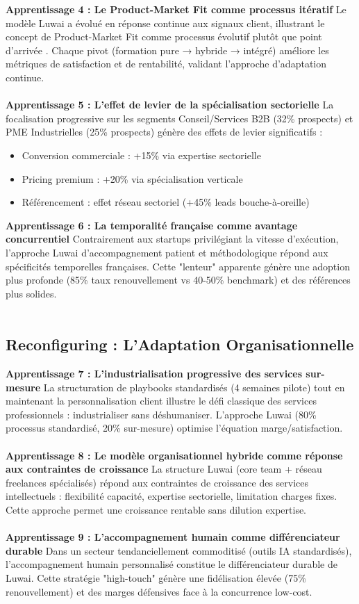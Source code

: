 \textbf{Apprentissage 4 : Le Product-Market Fit comme processus itératif}
Le modèle Luwai a évolué en réponse continue aux signaux client, illustrant le concept de Product-Market Fit comme processus évolutif plutôt que point d'arrivée \cite{blank2013startup}. Chaque pivot (formation pure → hybride → intégré) améliore les métriques de satisfaction et de rentabilité, validant l'approche d'adaptation continue.
\\\\
\textbf{Apprentissage 5 : L'effet de levier de la spécialisation sectorielle}
La focalisation progressive sur les segments Conseil/Services B2B (32\% prospects) et PME Industrielles (25\% prospects) génère des effets de levier significatifs :
\begin{itemize}
    \item Conversion commerciale : +15\% via expertise sectorielle
    \item Pricing premium : +20\% via spécialisation verticale
    \item Référencement : effet réseau sectoriel (+45\% leads bouche-à-oreille)
\end{itemize}
\medskip
\textbf{Apprentissage 6 : La temporalité française comme avantage concurrentiel}
Contrairement aux startups privilégiant la vitesse d'exécution, l'approche Luwai d'accompagnement patient et méthodologique répond aux spécificités temporelles françaises. Cette "lenteur" apparente génère une adoption plus profonde (85\% taux renouvellement vs 40-50\% benchmark) et des références plus solides.
\\\\
\subsection{Reconfiguring : L'Adaptation Organisationnelle}

\textbf{Apprentissage 7 : L'industrialisation progressive des services sur-mesure}
La structuration de playbooks standardisés (4 semaines pilote) tout en maintenant la personnalisation client illustre le défi classique des services professionnels : industrialiser sans déshumaniser. L'approche Luwai (80\% processus standardisé, 20\% sur-mesure) optimise l'équation marge/satisfaction.
\\\\
\textbf{Apprentissage 8 : Le modèle organisationnel hybride comme réponse aux contraintes de croissance}
La structure Luwai (core team + réseau freelances spécialisés) répond aux contraintes de croissance des services intellectuels : flexibilité capacité, expertise sectorielle, limitation charges fixes. Cette approche permet une croissance rentable sans dilution expertise.
\\\\
\textbf{Apprentissage 9 : L'accompagnement humain comme différenciateur durable}
Dans un secteur tendanciellement commoditisé (outils IA standardisés), l'accompagnement humain personnalisé constitue le différenciateur durable de Luwai. Cette stratégie "high-touch" génère une fidélisation élevée (75\% renouvellement) et des marges défensives face à la concurrence low-cost.
\\\\
